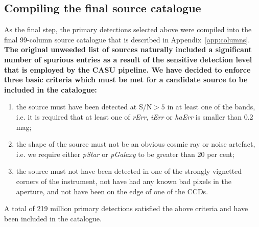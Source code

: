 \documentclass[a4paper,useAMS,usenatbib]{mn2e}
\begin{document}
\subsection{Compiling the final source catalogue}

As the final step, the primary detections
selected above were compiled
into the final 99-column source catalogue
that is described in Appendix~\ref{app:columns}.
{ \bf
The original unweeded list of sources naturally included 
a significant number of spurious entries
as a result of the sensitive detection level
that is employed by the CASU pipeline.
We have decided to enforce three basic criteria
which must be met for a candidate source
to be included in the catalogue:}
\begin{enumerate}
\item the source must have been detected at S/N$>5$ in at least
one of the bands, i.e. it is required that at least one of
\emph{rErr}, \emph{iErr} or \emph{haErr} is smaller
than 0.2 mag;
\item the shape of the source must not be an obvious
cosmic ray or noise artefact, i.e. we require
either \emph{pStar} or \emph{pGalaxy} to be
greater than 20 per cent;
\item the source must not have been detected
in one of the strongly vignetted corners of the instrument, 
not have had any known bad pixels in the aperture,
and not have been on the edge of one of the CCDs.
\end{enumerate}

A total of 219 million primary detections satisfied
the above criteria and have been included in the catalogue.
\end{document}
